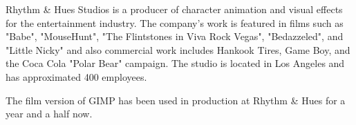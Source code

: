 Rhythm \& Hues Studios is a producer of character animation and visual effects
for the entertainment industry. The company's work is featured in films such as 
"Babe", "MouseHunt", "The Flintstones in Viva Rock Vegas", "Bedazzeled", and
"Little Nicky" and also commercial work includes Hankook Tires, Game Boy, and the
Coca Cola "Polar Bear" campaign. The studio is located in Los Angeles and has
approximated 400 employees.

The film version of GIMP has been used in production at Rhythm \& Hues for
a year and a half now.
